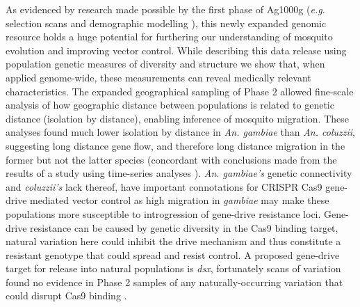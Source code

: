 \documentclass[a4paper,11pt,abstracton,hidelinks]{scrartcl}
\begin{document}
As evidenced by research made possible by the first phase of Ag1000g \cite{Ag1000gConsortium2017} (\textit{e.g.} selection scans \cite{xue2019} and demographic modelling \cite{khatri2018}), this newly expanded genomic resource holds a huge potential for furthering our understanding of mosquito evolution and improving vector control.
%
While describing this data release using population genetic measures of diversity and structure we show that, when applied genome-wide, these measurements can reveal medically relevant characteristics.
%
The expanded geographical sampling of Phase 2 allowed fine-scale analysis of how geographic distance between populations is related to genetic distance (isolation by distance), enabling inference of mosquito migration.
%
These analyses found much lower isolation by distance in \textit{An. gambiae} than \textit{An. coluzzii}, suggesting long distance gene flow, and therefore long distance migration in the former but not the latter species (concordant with conclusions made from the results of a study using time-series analyses \cite{dao2014}).
%
\textit{An. gambiae’s} genetic connectivity and \textit{coluzzii's} lack thereof, have important connotations for CRISPR Cas9 gene-drive mediated vector control as high migration in \textit{gambiae} may make these populations more susceptible to introgression of gene-drive resistance loci.
%
Gene-drive resistance can be caused by genetic diversity in the Cas9 binding target, natural variation here could inhibit the drive mechanism and thus constitute a resistant genotype that could spread and resist control.
%
A proposed gene-drive target for release into natural populations is \textit{dsx}, fortunately scans of variation found no evidence in Phase 2 samples of any naturally-occurring variation that could disrupt Cas9 binding \cite{kyrou2018}. 
\end{document}
